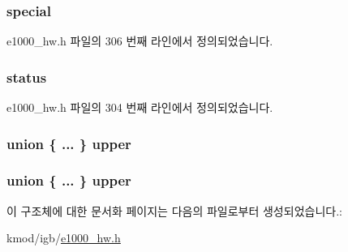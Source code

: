 \subsubsection[{\texorpdfstring{special}{special}}]{ special}\hypertarget{structe1000__tx__desc_a583ef448358a17812f8e8febe5da37a3}{}\label{structe1000__tx__desc_a583ef448358a17812f8e8febe5da37a3}


e1000\+\_\+hw.\+h 파일의 306 번째 라인에서 정의되었습니다.

\subsubsection[{\texorpdfstring{status}{status}}]{ status}\hypertarget{structe1000__tx__desc_aa648386576736be0dd25c95b6edd37d2}{}\label{structe1000__tx__desc_aa648386576736be0dd25c95b6edd37d2}


e1000\+\_\+hw.\+h 파일의 304 번째 라인에서 정의되었습니다.

\subsubsection[{\texorpdfstring{upper}{upper}}]{\setlength{\rightskip}{0pt plus 5cm}union \{ ... \}   upper}\hypertarget{structe1000__tx__desc_a7695eb19e56889cbf4d7b5d53a5c29f9}{}\label{structe1000__tx__desc_a7695eb19e56889cbf4d7b5d53a5c29f9}
\subsubsection[{\texorpdfstring{upper}{upper}}]{\setlength{\rightskip}{0pt plus 5cm}union \{ ... \}   upper}\hypertarget{structe1000__tx__desc_af3e5d27ab120986fbbcd3deff79bf164}{}\label{structe1000__tx__desc_af3e5d27ab120986fbbcd3deff79bf164}


이 구조체에 대한 문서화 페이지는 다음의 파일로부터 생성되었습니다.\+:\begin{DoxyCompactItemize}
\item 
kmod/igb/\hyperlink{kmod_2igb_2e1000__hw_8h}{e1000\+\_\+hw.\+h}\end{DoxyCompactItemize}
